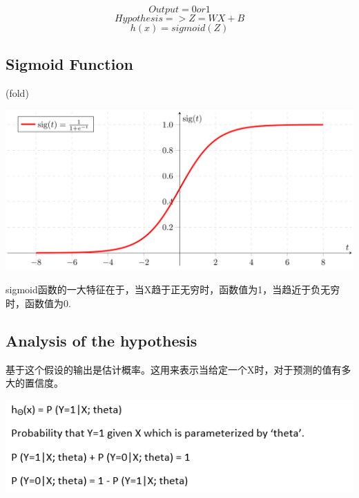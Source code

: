 \documentclass[UTF8]{ctexart}
\begin{document}
$$Output = 0 or 1$$
$$Hypothesis => Z = WX+B$$
$$h(x) = sigmoid(Z)$$

\subsection{Sigmoid Function
} (fold)
\label{sub:sigmoid_function_}

\begin{center}
\includegraphics[width = 6in]{sigmoid.png}
\end{center}

sigmoid函数的一大特征在于，当X趋于正无穷时，函数值为1，当趋近于负无穷时，函数值为0.

\subsection{Analysis of the hypothesis} %
\label{sub:analysis_of_the_hypothesis}

基于这个假设的输出是估计概率。这用来表示当给定一个X时，对于预测的值有多大的置信度。

\begin{center}
\includegraphics[width = 6in]{representation.png}
\end{center}
\end{document}
